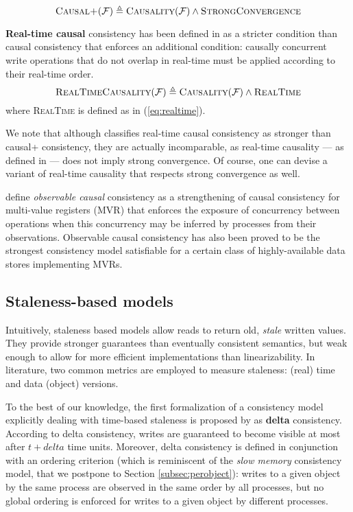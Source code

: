 \documentclass[letter, 11pt]{article}
\newcommand{\citeN}{\citet}
\renewcommand{\cite}{\citep}
\begin{document}
\begin{equation}
\textsc{Causal+}(\mathcal{F}) \triangleq \textsc{Causality}(\mathcal{F}) \wedge \textsc{StrongConvergence}
\end{equation}

\textbf{Real-time causal} consistency has been defined in \cite{P-Mahajan.Dahlin:11} 
as a stricter condition than causal consistency that
enforces an additional condition: causally concurrent write operations that do not 
overlap in real-time must be applied according to their real-time order.
\begin{equation}
\textsc{RealTimeCausality}(\mathcal{F}) \triangleq 
\textsc{Causality}(\mathcal{F}) \wedge \textsc{RealTime}
\end{equation}
where \textsc{RealTime} is defined as in (\ref{eq:realtime}).

We note that although \cite{Lloyd.Freedman.ea:11} classifies real-time causal consistency as stronger than causal+ consistency, they are actually incomparable, as real-time causality --- as defined in \cite{P-Mahajan.Dahlin:11} --- does not imply strong convergence. Of course, one can devise a variant of real-time causality that respects strong convergence as well. 

\citeN{Attiya.ea:15} define \emph{observable causal} consistency as a strengthening of causal consistency
for multi-value registers (MVR)
that enforces the exposure of concurrency between operations when this concurrency may be inferred by processes from their observations.
Observable causal consistency has also been proved to be the strongest consistency model satisfiable 
for a certain class of highly-available data stores implementing MVRs.





\subsection{Staleness-based models}
\label{subsec:timed}
Intuitively, staleness based models allow reads to return old, \emph{stale} written values. They provide stronger guarantees than eventually consistent semantics, but weak enough to allow for more efficient implementations than linearizability. In literature, two common metrics are employed to measure staleness: (real) time and data (object) versions.

To the best of our knowledge, the first formalization of a consistency model explicitly dealing with time-based staleness is proposed by \citeN{Singla.ea:97}
as \textbf{delta} consistency.
According to delta consistency, writes are guaranteed to become visible at most after $t+delta$ time units.
Moreover, delta consistency is defined in conjunction with an ordering criterion (which is reminiscent of the \emph{slow memory} consistency model, that we postpone to Section \ref{subsec:perobject}):
writes to a given object by the same process are observed in the same order by all processes, 
but no global ordering is enforced for writes to a given object by different processes.
\end{document}

